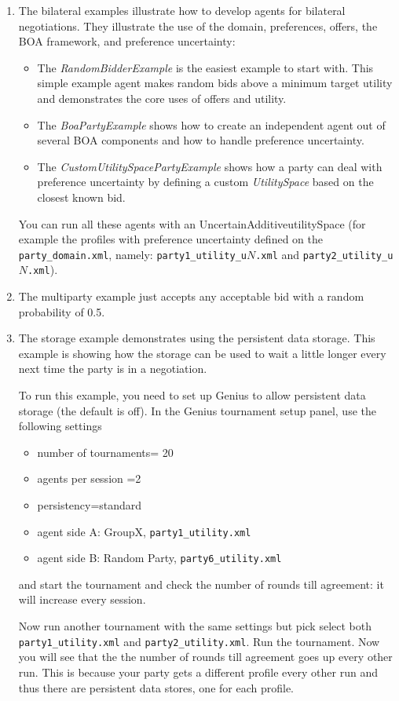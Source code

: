 \documentclass[]{llncs}
\newcommand\Genius{{\sc Genius}}
\begin{document}
\begin{enumerate}
	
\item The bilateral examples illustrate how to develop agents for bilateral negotiations. They illustrate the use of the domain, preferences, offers, the BOA framework, and preference uncertainty:
\begin{itemize}
	\item  The \textit{RandomBidderExample} is the easiest example to start with. This simple example agent makes random bids above a minimum target utility and demonstrates the core uses of offers and utility.
	\item  The \textit{BoaPartyExample} shows how to create an independent agent out of several BOA components and how to handle preference uncertainty.
	\item  The \textit{CustomUtilitySpacePartyExample} shows how a party can deal with preference uncertainty by defining a custom \textit{UtilitySpace} based on the closest known bid.
\end{itemize}

You can run all these agents with an UncertainAdditiveutilitySpace (for example the profiles with preference uncertainty defined on the \verb|party_domain.xml|, namely: \verb|party1_utility_u|$N$\verb|.xml| and \verb|party2_utility_u|$N$\verb|.xml|).
	
\item The multiparty example just accepts any acceptable bid with a random probability of 0.5.

\item The storage example demonstrates using the persistent data storage. This example is showing how the storage can be used to wait a little longer every next time the party is in a negotiation.

To run this example, you need to set up {\Genius} to allow persistent data storage (the default is off). In the {\Genius} tournament setup panel, use the following settings
\begin{itemize}
\item  number of tournaments= 20
\item  agents per session =2
\item  persistency=standard
\item  agent side A: GroupX, \verb|party1_utility.xml|
\item  agent side B: Random Party, \verb|party6_utility.xml|
\end{itemize}

and start the tournament and check the number of rounds till agreement: it will increase every session.

Now run another tournament with the same settings but pick select both \verb|party1_utility.xml| and \verb|party2_utility.xml|. Run the tournament.
Now you will see that the the number of rounds till agreement goes up every other run. This is because your party gets a different profile every other run and thus there are persistent data stores, one for each profile. 



\end{enumerate}
\end{document}
